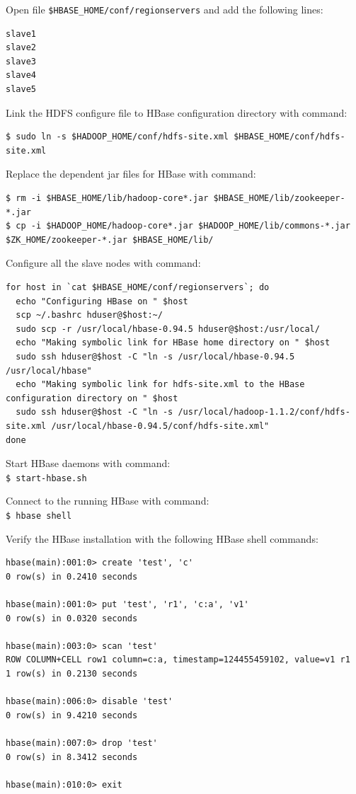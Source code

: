 Open file \verb|$HBASE_HOME/conf/regionservers| and add the following lines:
\begin{verbatim}
slave1
slave2
slave3
slave4
slave5
\end{verbatim}

Link the HDFS configure file to HBase configuration directory with command:
\lstset{style=bashstyle}
\begin{lstlisting}
$ sudo ln -s $HADOOP_HOME/conf/hdfs-site.xml $HBASE_HOME/conf/hdfs-site.xml
\end{lstlisting}

Replace the dependent jar files for HBase with command:
\lstset{style=bashstyle}
\begin{lstlisting}
$ rm -i $HBASE_HOME/lib/hadoop-core*.jar $HBASE_HOME/lib/zookeeper-*.jar
$ cp -i $HADOOP_HOME/hadoop-core*.jar $HADOOP_HOME/lib/commons-*.jar $ZK_HOME/zookeeper-*.jar $HBASE_HOME/lib/
\end{lstlisting}

Configure all the slave nodes with command:
\lstset{style=bashstyle}
\begin{lstlisting}
for host in `cat $HBASE_HOME/conf/regionservers`; do
  echo "Configuring HBase on " $host
  scp ~/.bashrc hduser@$host:~/
  sudo scp -r /usr/local/hbase-0.94.5 hduser@$host:/usr/local/
  echo "Making symbolic link for HBase home directory on " $host
  sudo ssh hduser@$host -C "ln -s /usr/local/hbase-0.94.5 /usr/local/hbase"
  echo "Making symbolic link for hdfs-site.xml to the HBase configuration directory on " $host
  sudo ssh hduser@$host -C "ln -s /usr/local/hadoop-1.1.2/conf/hdfs-site.xml /usr/local/hbase-0.94.5/conf/hdfs-site.xml"
done
\end{lstlisting}

Start HBase daemons with command: \\
\verb|$ start-hbase.sh|

Connect to the running HBase with command: \\
\verb|$ hbase shell|

Verify the HBase installation with the following HBase shell commands: 
\lstset{style=bashstyle}
\begin{lstlisting}
hbase(main):001:0> create 'test', 'c'
0 row(s) in 0.2410 seconds

hbase(main):001:0> put 'test', 'r1', 'c:a', 'v1'
0 row(s) in 0.0320 seconds

hbase(main):003:0> scan 'test'
ROW COLUMN+CELL row1 column=c:a, timestamp=124455459102, value=v1 r1
1 row(s) in 0.2130 seconds

hbase(main):006:0> disable 'test'
0 row(s) in 9.4210 seconds

hbase(main):007:0> drop 'test'
0 row(s) in 8.3412 seconds

hbase(main):010:0> exit
\end{lstlisting}

